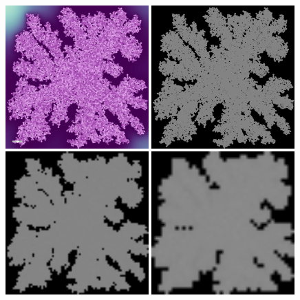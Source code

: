 \begin{figure}[h]
    \centering
    \includegraphics[width=0.49\textwidth]{figures/sim-branching/cells_at_iter_0000006600.png}%
    \hspace{0.01\textwidth}%
    \includegraphics[width=0.49\textwidth]{figures/sim-branching/diffusion-80/discretization-nvoxels-000666.png}\\%
    \includegraphics[width=0.49\textwidth]{figures/sim-branching/diffusion-80/discretization-nvoxels-000080.png}%
    \hspace{0.01\textwidth}%
    \includegraphics[width=0.49\textwidth]{figures/sim-branching/diffusion-80/discretization-nvoxels-000042.png}%

\end{figure}

